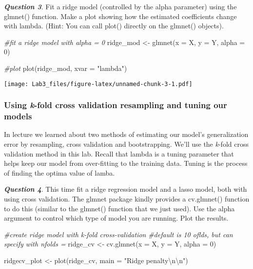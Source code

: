 \documentclass[
]{article}
\newenvironment{Shaded}{\begin{snugshade}}{\end{snugshade}}
\newcommand{\AttributeTok}[1]{\textcolor[rgb]{0.77,0.63,0.00}{#1}}
\newcommand{\CommentTok}[1]{\textcolor[rgb]{0.56,0.35,0.01}{\textit{#1}}}
\newcommand{\DecValTok}[1]{\textcolor[rgb]{0.00,0.00,0.81}{#1}}
\newcommand{\FunctionTok}[1]{\textcolor[rgb]{0.00,0.00,0.00}{#1}}
\newcommand{\NormalTok}[1]{#1}
\newcommand{\OtherTok}[1]{\textcolor[rgb]{0.56,0.35,0.01}{#1}}
\newcommand{\SpecialCharTok}[1]{\textcolor[rgb]{0.00,0.00,0.00}{#1}}
\newcommand{\StringTok}[1]{\textcolor[rgb]{0.31,0.60,0.02}{#1}}
\begin{document}
\textbf{\emph{Question 3}}. Fit a ridge model (controlled by the alpha
parameter) using the glmnet() function. Make a plot showing how the
estimated coefficients change with lambda. (Hint: You can call plot()
directly on the glmnet() objects).

\begin{Shaded}
\begin{Highlighting}[]
\CommentTok{\#fit a ridge model with alpha = 0}
\NormalTok{ridge\_mod }\OtherTok{\textless{}{-}} \FunctionTok{glmnet}\NormalTok{(}\AttributeTok{x =}\NormalTok{ X,}
                    \AttributeTok{y =}\NormalTok{ Y,}
                    \AttributeTok{alpha =} \DecValTok{0}\NormalTok{)}

\CommentTok{\#plot}
\FunctionTok{plot}\NormalTok{(ridge\_mod, }\AttributeTok{xvar =} \StringTok{"lambda"}\NormalTok{)}
\end{Highlighting}
\end{Shaded}

\texttt{[image: Lab3\_files/figure-latex/unnamed-chunk-3-1.pdf]}

\hypertarget{using-k-fold-cross-validation-resampling-and-tuning-our-models}{%
\subsubsection{\texorpdfstring{Using \emph{k}-fold cross validation
resampling and tuning our
models}{Using k-fold cross validation resampling and tuning our models}}\label{using-k-fold-cross-validation-resampling-and-tuning-our-models}}

In lecture we learned about two methods of estimating our model's
generalization error by resampling, cross validation and bootstrapping.
We'll use the \emph{k}-fold cross validation method in this lab. Recall
that lambda is a tuning parameter that helps keep our model from
over-fitting to the training data. Tuning is the process of finding the
optima value of lamba.

\textbf{\emph{Question 4}}. This time fit a ridge regression model and a
lasso model, both with using cross validation. The glmnet package kindly
provides a cv.glmnet() function to do this (similar to the glmnet()
function that we just used). Use the alpha argument to control which
type of model you are running. Plot the results.

\begin{Shaded}
\begin{Highlighting}[]
\CommentTok{\#create ridge model with k{-}fold cross{-}validation}
\CommentTok{\#default is 10 oflds, but can specify with nfolds =}
\NormalTok{ridge\_cv }\OtherTok{\textless{}{-}} \FunctionTok{cv.glmnet}\NormalTok{(}\AttributeTok{x =}\NormalTok{ X,}
                      \AttributeTok{y =}\NormalTok{ Y,}
                      \AttributeTok{alpha =} \DecValTok{0}\NormalTok{)}
                      

\NormalTok{ridgecv\_plot }\OtherTok{\textless{}{-}} \FunctionTok{plot}\NormalTok{(ridge\_cv, }
                     \AttributeTok{main =} \StringTok{"Ridge penalty}\SpecialCharTok{\textbackslash{}n\textbackslash{}n}\StringTok{"}\NormalTok{)}
\end{Highlighting}
\end{Shaded}
\end{document}
